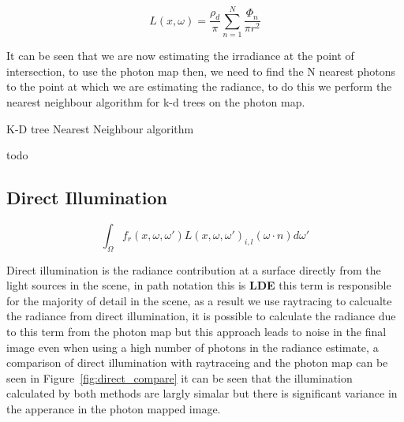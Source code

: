 \begin{equation}
L(x, \omega) = \frac{\rho_d}{\pi}\sum\limits_{n = 1}^N \frac{\Phi_n}{\pi r ^ 2}
\end{equation}

It can be seen that we are now estimating the irradiance at the point of intersection, to use the photon map then, we need to
find the N nearest photons to the point at which we are estimating the radiance, to do this we perform the nearest neighbour
algorithm for k-d trees on the photon map.

\begin{algorithm}
\begin{algorithmic}
\caption{K-D tree Nearest Neighbour algorithm}
\State todo
\end{algorithmic}
\end{algorithm}

\subsection{Direct Illumination}
\begin{equation}
			\int_{\Omega}
				f_{r}(x, \omega, \omega')
				L(x,\omega,\omega')_{i,l}
				(\omega \cdot n)d\omega'
\end{equation}

Direct illumination is the radiance contribution at a surface directly from the light sources in the scene, in path notation
this is \textbf{LDE} this term is responsible for the majority of detail in the scene, as a result we use raytracing to calcualte
the radiance from direct illumination, it is possible to calculate the radiance due to this term from the photon map but this
approach leads to noise in the final image even when using a high number of photons in the radiance estimate, a comparison of
direct illumination with raytraceing and the photon map can be seen in Figure~\ref{fig:direct_compare} it can be seen that
the illumination calculated by both methods are largly simalar but there is significant variance in the apperance in the
photon mapped image.

